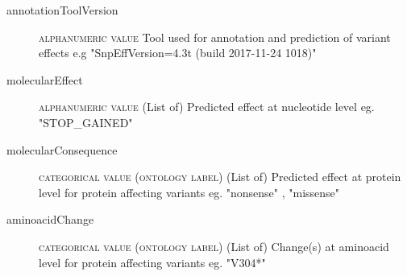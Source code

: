 \documentclass[a4paper, 10pt]{article}        %
\begin{document}
\begin{description}
\begin{itemize}
	\end{itemize} 
	\item[annotationToolVersion] {\textsc{alphanumeric value}} Tool used for annotation and prediction of variant effects e.g "SnpEffVersion=4.3t (build 2017-11-24 1018)"
	\item[molecularEffect] {\textsc{alphanumeric value}} (List of) Predicted effect at nucleotide level eg. "STOP\_GAINED"
	\item[molecularConsequence]  {\textsc{categorical value (ontology label)}} (List of) Predicted effect at protein level for protein affecting variants eg. "nonsense" , "missense"
	\item[aminoacidChange]  {\textsc{categorical value (ontology label)}} (List of) Change(s) at aminoacid level for protein affecting variants eg. "V304*"
	
 \end{description}



\end{document}
